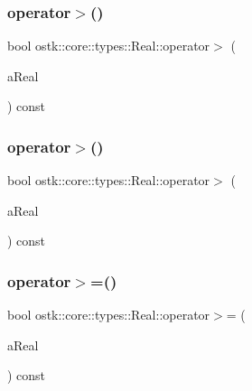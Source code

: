 \mbox{\label{classostk_1_1core_1_1types_1_1_real_a24a0a87f547ebe623bff469a01ec8420}} 
\subsubsection{\texorpdfstring{operator$>$()}{operator>()}\hspace{0.1cm}{\footnotesize\ttfamily [1/2]}}
{\footnotesize\ttfamily bool ostk\+::core\+::types\+::\+Real\+::operator$>$ (\begin{DoxyParamCaption}\item[{const \hyperlink{classostk_1_1core_1_1types_1_1_real}{Real} \&}]{a\+Real }\end{DoxyParamCaption}) const}

\mbox{\label{classostk_1_1core_1_1types_1_1_real_a65763adc12c4edf9fce0d608f1df53b0}} 
\subsubsection{\texorpdfstring{operator$>$()}{operator>()}\hspace{0.1cm}{\footnotesize\ttfamily [2/2]}}
{\footnotesize\ttfamily bool ostk\+::core\+::types\+::\+Real\+::operator$>$ (\begin{DoxyParamCaption}\item[{const \hyperlink{classostk_1_1core_1_1types_1_1_real_aa26f796c30b514c98d573f82e3b02296}{Real\+::\+Value\+Type} \&}]{a\+Real }\end{DoxyParamCaption}) const}

\mbox{\label{classostk_1_1core_1_1types_1_1_real_ad53951b2603abd100fc9abaf08a0895e}} 
\subsubsection{\texorpdfstring{operator$>$=()}{operator>=()}\hspace{0.1cm}{\footnotesize\ttfamily [1/2]}}
{\footnotesize\ttfamily bool ostk\+::core\+::types\+::\+Real\+::operator$>$= (\begin{DoxyParamCaption}\item[{const \hyperlink{classostk_1_1core_1_1types_1_1_real}{Real} \&}]{a\+Real }\end{DoxyParamCaption}) const}

